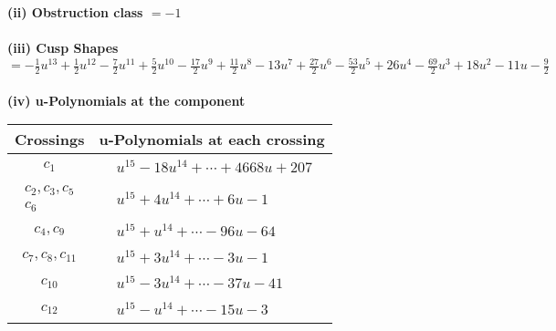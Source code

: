 \documentclass[1p]{elsarticle_modified}
\theoremstyle{definition}
\begin{document}
\flushleft \textbf{(ii) Obstruction class $= -1$}\\~\\
\flushleft \textbf{(iii) Cusp Shapes $= -\frac{1}{2} u^{13}+\frac{1}{2} u^{12}-\frac{7}{2} u^{11}+\frac{5}{2} u^{10}-\frac{17}{2} u^9+\frac{11}{2} u^8-13 u^7+\frac{27}{2} u^6-\frac{53}{2} u^5+26 u^4-\frac{69}{2} u^3+18 u^2-11 u-\frac{9}{2}$}\\~\\
\newpage\renewcommand{\arraystretch}{1}
\flushleft \textbf{(iv) u-Polynomials at the component}\newline \\
\begin{tabular}{m{50pt}|m{274pt}}
Crossings & \hspace{64pt}u-Polynomials at each crossing \\
\hline $$\begin{aligned}c_{1}\end{aligned}$$&$\begin{aligned}
&u^{15}-18 u^{14}+\cdots+4668 u+207
\end{aligned}$\\
\hline $$\begin{aligned}c_{2},c_{3},c_{5}\\c_{6}\end{aligned}$$&$\begin{aligned}
&u^{15}+4 u^{14}+\cdots+6 u-1
\end{aligned}$\\
\hline $$\begin{aligned}c_{4},c_{9}\end{aligned}$$&$\begin{aligned}
&u^{15}+u^{14}+\cdots-96 u-64
\end{aligned}$\\
\hline $$\begin{aligned}c_{7},c_{8},c_{11}\end{aligned}$$&$\begin{aligned}
&u^{15}+3 u^{14}+\cdots-3 u-1
\end{aligned}$\\
\hline $$\begin{aligned}c_{10}\end{aligned}$$&$\begin{aligned}
&u^{15}-3 u^{14}+\cdots-37 u-41
\end{aligned}$\\
\hline $$\begin{aligned}c_{12}\end{aligned}$$&$\begin{aligned}
&u^{15}- u^{14}+\cdots-15 u-3
\end{aligned}$\\
\hline
\end{tabular}\\~\\
\end{document}
